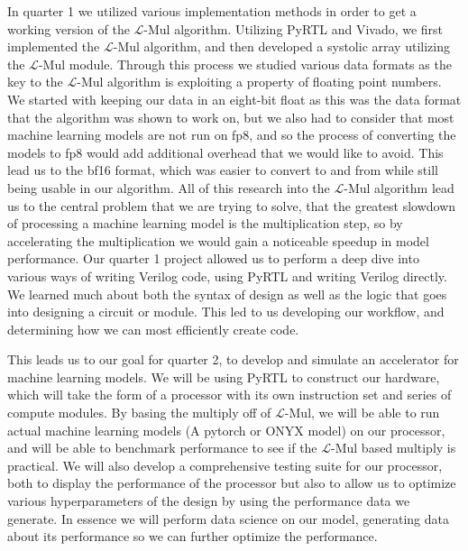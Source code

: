 \documentclass[12pt,letterpaper]{article}
\newcommand{\lmul}{$\mathcal{L}$-Mul\xspace}
\begin{document}
In quarter 1 we utilized various implementation methods in order to get a working version of the \lmul algorithm.  Utilizing PyRTL and Vivado, we first implemented the \lmul algorithm, and then developed a systolic array utilizing the \lmul module.  Through this process we studied various data formats as the key to the \lmul algorithm is exploiting a property of floating point numbers.  We started with keeping our data in an eight-bit float as this was the data format that the algorithm was shown to work on, but we also had to consider that most machine learning models are not run on fp8, and so the process of converting the models to fp8 would add additional overhead that we would like to avoid.  This lead us to the bf16 format, which was easier to convert to and from while still being usable in our algorithm.  All of this research into the \lmul algorithm lead us to the central problem that we are trying to solve, that the greatest slowdown of processing a machine learning model is the multiplication step, so by accelerating the multiplication we would gain a noticeable speedup in model performance.  Our quarter 1 project allowed us to perform a deep dive into various ways of writing Verilog code, using PyRTL and writing Verilog directly.  We learned much about both the syntax of design as well as the logic that goes into designing a circuit or module.  This led to us developing our workflow, and determining how we can most efficiently create code.

This leads us to our goal for quarter 2, to develop and simulate an accelerator for machine learning models.  We will be using PyRTL to construct our hardware, which will take the form of a processor with its own instruction set and series of compute modules.  By basing the multiply off of \lmul, we will be able to run actual machine learning models (A pytorch or ONYX model) on our processor, and will be able to benchmark performance to see if the \lmul based multiply is practical.  We will also develop a comprehensive testing suite for our processor, both to display the performance of the processor but also to allow us to optimize various hyperparameters of the design by using the performance data we generate.  In essence we will perform data science on our model, generating data about its performance so we can further optimize the performance.  


\end{document}
